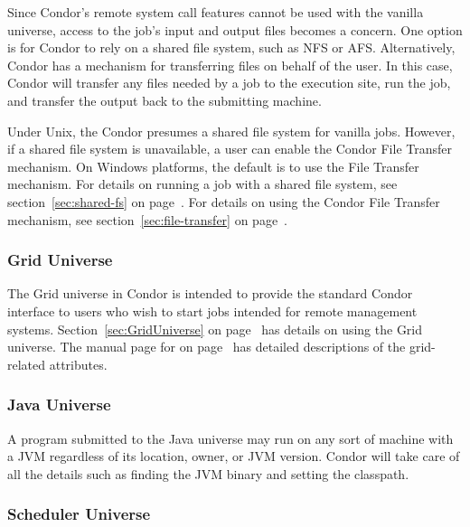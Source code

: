 Since Condor's remote system call features cannot be used with the
vanilla universe, access to the job's input and output files becomes a
concern.
One option is for Condor to rely on a shared file system, such as NFS
or AFS. 
Alternatively, Condor has a mechanism for transferring files on behalf
of the user.
In this case, Condor will transfer any files needed by a job to the
execution site, run the job, and transfer the output back to the
submitting machine.

Under Unix, the Condor presumes a shared file system for vanilla jobs. 
However, if a shared file system is unavailable, a user can enable the
Condor File Transfer mechanism.
On Windows platforms, the default is to use the File Transfer
mechanism.
For details on running a job with a shared file system, see
section~\ref{sec:shared-fs} on page~\pageref{sec:shared-fs}.
For details on using the Condor File Transfer mechanism, see 
section~\ref{sec:file-transfer} on page~\pageref{sec:file-transfer}.


\subsubsection{Grid Universe}

The Grid universe in Condor is intended to provide the standard
Condor interface to users who wish to start jobs
intended for remote management systems.
Section~\ref{sec:GridUniverse} on page~\pageref{sec:GridUniverse}
has details on using the Grid universe.
The manual page for 
on page~\pageref{man-condor-submit}
has detailed descriptions of
the grid-related attributes.

\subsubsection{Java Universe}


A program submitted to the Java universe may run on any sort of machine
with a JVM regardless of its location, owner, or JVM version.  Condor
will take care of all the details such as finding the JVM binary and
setting the classpath.

\subsubsection{Scheduler Universe}

